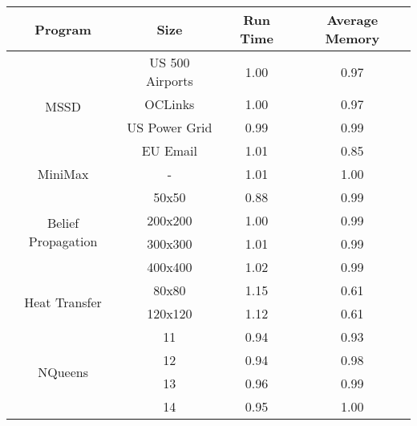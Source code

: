 \begin{tabular}{c | c || c | c} \hline
	\textbf{Program} & \textbf{Size} & \textbf{Run Time} & \textbf{Average Memory}\\ \hline \hline
	\multirow{4}{*}{MSSD}  & US 500 Airports &  1.00  &  0.97
  \\
		 & OCLinks &  1.00  &  0.97
  \\
		 & US Power Grid &  0.99  &  0.99
  \\
		 & EU Email &  1.01  &  0.85
  \\
	\hline
	MiniMax  & - &  1.01  &  1.00
  \\
	\hline
	\multirow{4}{*}{Belief Propagation}  & 50x50 &  0.88  &  0.99
  \\
		 & 200x200 &  1.00  &  0.99
  \\
		 & 300x300 &  1.01  &  0.99
  \\
		 & 400x400 &  1.02  &  0.99
  \\
	\hline
	\multirow{2}{*}{Heat Transfer}  & 80x80 &  1.15  &  0.61
  \\
		 & 120x120 &  1.12  &  0.61
  \\
	\hline
	\multirow{4}{*}{NQueens}  & 11 &  0.94  &  0.93
  \\
		 & 12 &  0.94  &  0.98
  \\
		 & 13 &  0.96  &  0.99
  \\
		 & 14 &  0.95  &  1.00
  \\
	\hline
\end{tabular}
